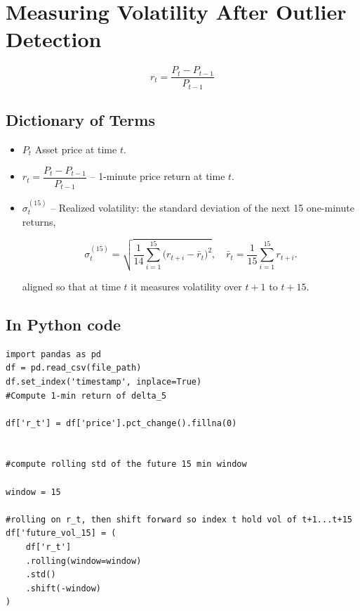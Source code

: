 \documentclass[12pt]{article}
\begin{document}
\section{Measuring Volatility After Outlier Detection}




\begin{equation}\label{eq:price_return}
    r_t = \frac{P_{t} - P_{t-1}}{P_{t-1}}
\end{equation}


\subsection{Dictionary of Terms}

\begin{itemize}
    \item $P_t$  
      Asset price at time $t$.
    \item $r_t = \dfrac{P_t - P_{t-1}}{P_{t-1}}$  
      – 1-minute price return at time $t$.
    \item $\sigma^{\mathrm{(15)}}_{t}$  
      – Realized volatility: the standard deviation of the next 15 one-minute returns,
      
      

      
      \begin{equation}\label{eq:realized-vol}
        \sigma^{\mathrm{(15)}}_{t}
        = \sqrt{\frac{1}{14}\sum_{i=1}^{15}\bigl(r_{t+i}-\bar r_{t}\bigr)^{2}},
        \quad
        \bar r_{t} = \frac{1}{15}\sum_{i=1}^{15} r_{t+i}.
      \end{equation}
      



      aligned so that at time $t$ it measures volatility over $t+1$ to $t+15$.
\end{itemize}



\subsection{In Python code}

\begin{verbatim}
import pandas as pd
df = pd.read_csv(file_path)
df.set_index('timestamp', inplace=True)
#Compute 1-min return of delta_5

df['r_t'] = df['price'].pct_change().fillna(0)


#compute rolling std of the future 15 min window

window = 15

#rolling on r_t, then shift forward so index t hold vol of t+1...t+15
df['future_vol_15] = (
    df['r_t']
    .rolling(window=window)
    .std()
    .shift(-window)
)
\end{verbatim}
\end{document}
